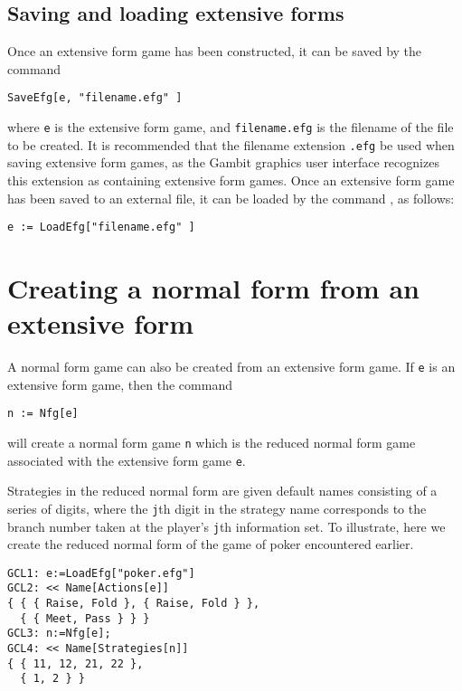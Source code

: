 \subsection{Saving and loading extensive forms}

Once an extensive form game has been constructed, it can be saved by
the command 

\begin{verbatim}
SaveEfg[e, "filename.efg" ]
\end{verbatim}

\noindent where \verb+e+ is the extensive form game, and
\verb+filename.efg+ is the filename of the file to be created.  It is
recommended that the filename extension \verb+.efg+ be used when
saving extensive form games, as the Gambit graphics user interface
recognizes this extension as containing extensive form games.  Once an
extensive form game has been saved to an external file, it can be
loaded by the command , as follows:

\begin{verbatim}
e := LoadEfg["filename.efg" ]
\end{verbatim}

\section{Creating a normal form from an extensive form}

A normal form game can also be created from an extensive form game.
If \verb+e+ is an extensive form game, then the command 

\begin{verbatim}
n := Nfg[e]
\end{verbatim}

\noindent
will create a normal form game \verb+n+ which is the reduced normal
form game associated with the extensive form game \verb+e+.  

Strategies in the reduced normal form are given default names
consisting of a series of digits, where the \verb+j+th digit in the
strategy name corresponds to the branch number taken at the player's
\verb+j+th information set.  To illustrate, here we create the reduced
normal form of the game of poker encountered earlier.  

\begin{verbatim}
GCL1: e:=LoadEfg["poker.efg"]
GCL2: << Name[Actions[e]]
{ { { Raise, Fold }, { Raise, Fold } },
  { { Meet, Pass } } }
GCL3: n:=Nfg[e];
GCL4: << Name[Strategies[n]]
{ { 11, 12, 21, 22 },
  { 1, 2 } }
\end{verbatim}

